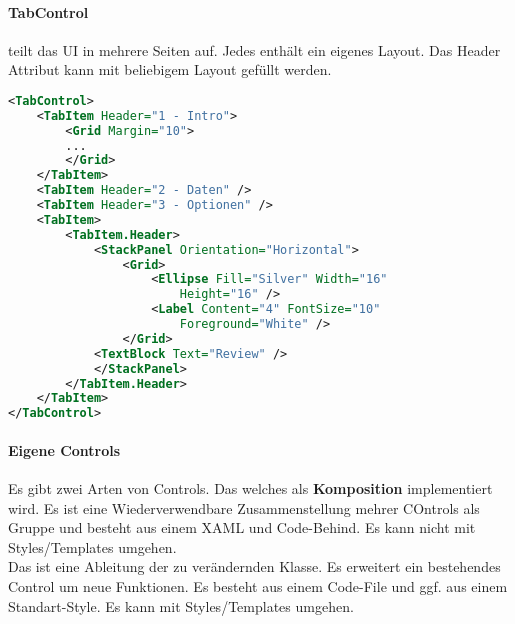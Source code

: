\paragraph{TabControl} teilt das UI in mehrere Seiten auf. Jedes  enthält ein eigenes Layout. Das Header Attribut kann mit beliebigem Layout gefüllt werden.
\begin{lstlisting}[language=xml]
<TabControl>
    <TabItem Header="1 - Intro">
        <Grid Margin="10">
        ...
        </Grid>
    </TabItem>
    <TabItem Header="2 - Daten" />
    <TabItem Header="3 - Optionen" />
    <TabItem>
        <TabItem.Header>
            <StackPanel Orientation="Horizontal">
                <Grid>
                    <Ellipse Fill="Silver" Width="16"
                        Height="16" />
                    <Label Content="4" FontSize="10"
                        Foreground="White" />
                </Grid>
            <TextBlock Text="Review" />
            </StackPanel>
        </TabItem.Header>
    </TabItem>
</TabControl>
\end{lstlisting}
\paragraph{Eigene Controls} Es gibt zwei Arten von Controls. Das  welches als \textbf{Komposition} implementiert wird. Es ist eine Wiederverwendbare Zusammenstellung mehrer COntrols als Gruppe und besteht aus einem XAML und Code-Behind. Es kann nicht mit Styles/Templates umgehen.\\
Das  ist eine Ableitung der zu verändernden Klasse. Es erweitert ein bestehendes Control um neue Funktionen. Es besteht aus einem Code-File und ggf. aus einem Standart-Style. Es kann mit Styles/Templates umgehen.